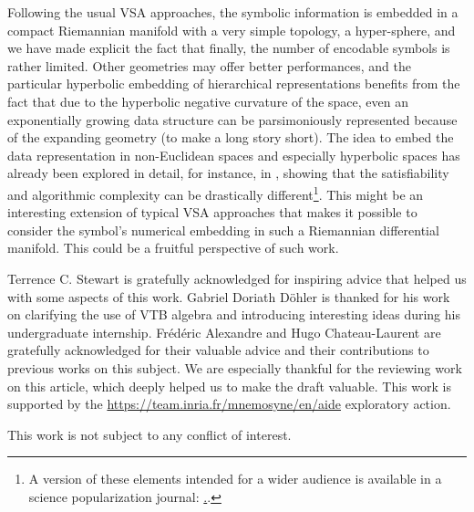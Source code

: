 \documentclass[sn-mathphys]{sn-jnl}
\begin{document}
Following the usual VSA approaches, the symbolic information is embedded in a compact Riemannian manifold with a very simple topology, a hyper-sphere, and we have made explicit the fact that finally, the number of encodable symbols is rather limited. Other geometries may offer better performances, and the particular hyperbolic embedding of hierarchical representations benefits from the fact that due to the hyperbolic negative curvature of the space, even an exponentially growing data structure can be parsimoniously represented \cite{nickel_poincare_2017} because of the expanding geometry (to make a long story short). The idea to embed the data representation in non-Euclidean spaces and especially hyperbolic spaces has already been explored in detail, for instance, in \cite{delahaye_complexites_2006}, showing that the satisfiability and algorithmic complexity can be drastically different\footnote{A version of these elements intended for a wider audience is available in a science popularization journal: \href{https://interstices.info/calculer-dans-un-monde-hyperbolique}..}. This might be an interesting extension of typical VSA approaches that makes it possible to consider the symbol's numerical embedding in such a Riemannian differential manifold. This could be a fruitful perspective of such work.


\backmatter


Terrence C. Stewart is gratefully acknowledged for inspiring advice that helped us with some aspects of this work. Gabriel Doriath Döhler is thanked for his work on clarifying the use of VTB algebra and introducing interesting ideas during his undergraduate internship. Frédéric Alexandre and Hugo Chateau-Laurent are gratefully acknowledged for their valuable advice and their contributions to previous works on this subject. We are especially thankful for the reviewing work on this article, which deeply helped us to make the draft valuable. This work is supported by the \href{Inria, AEx AIDE}{https://team.inria.fr/mnemosyne/en/aide} exploratory action.


This work is not subject to any conflict of interest.
\end{document}
